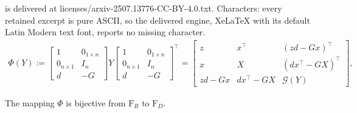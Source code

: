 \documentclass[10pt,a4paper]{amsart}
\def\G{\mathcal{G}}
\begin{document}
is delivered at licenses/arxiv-2507.13776-CC-BY-4.0.txt. Characters: every retained excerpt is pure ASCII, so the delivered engine, XeLaTeX with its default Latin Modern text font, reports no missing character.
     \begin{equation}
     \label{phi}
     \begin{aligned}
     \Phi\left(Y\right):=\begin{bmatrix}
             1&0_{1\times n}\\
             0_{n\times 1}&I_n\\
             d&-G
         \end{bmatrix}Y\begin{bmatrix}
             1&0_{1\times n}\\
             0_{n\times 1}&I_n\\
             d&-G
         \end{bmatrix}^\top
         =\begin{bmatrix}
             z&x^\top&(zd-Gx)^\top\\
             x&X&(dx^\top-GX)^\top\\
             zd-Gx&dx^\top-GX&\G(Y)
         \end{bmatrix},
     \end{aligned}
     \end{equation}

\begin{lemma}\label{lemma-F1-F2}
The mapping $\Phi$ is bijective from ${\mathrm{F}_R}$ to ${\mathrm{F}_D}$.
\end{lemma}
\end{document}
